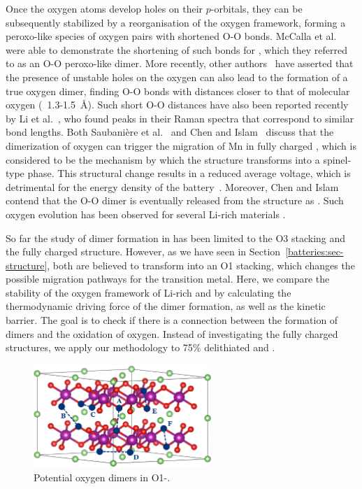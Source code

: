 \begin{refsection}
Once the oxygen atoms develop holes on their $p$-orbitals, they can be 
subsequently stabilized by a reorganisation of the oxygen framework, forming a 
peroxo-like species of oxygen pairs with shortened O-O bonds. McCalla et 
al.~\cite{McCalla2015} were able to demonstrate the shortening of such bonds 
for , which they referred to as an O-O peroxo-like dimer. More 
recently, other authors~\cite{Saubanere2016, Chen2016} have asserted that the 
presence of unstable holes on the oxygen can also lead to the formation of a 
true oxygen dimer, finding O-O bonds with distances closer to that of 
molecular oxygen (~1.3-1.5~\si{\angstrom}). Such short O-O distances have also 
been reported recently by Li et al.~\cite{Li2018}, who found peaks in their 
Raman spectra that correspond to similar bond lengths. Both Saubani\`ere et 
al.~\cite{Saubanere2016} and Chen and Islam~\cite{Chen2016} discuss that the 
dimerization of oxygen can trigger the migration of Mn in fully charged 
, which is considered to be the mechanism by which the structure 
transforms into a spinel-type phase. This structural change results in a 
reduced average voltage, which is detrimental for the energy density of the 
battery~\cite{Rozier2015}. Moreover, Chen and Islam contend that the O-O dimer is eventually 
released from the structure as . Such oxygen evolution has been 
observed for several Li-rich materials \cite{Armstrong2006, Luo2016}.
 
So far the study of dimer formation in  has been limited to the O3 
stacking and the fully charged structure. However, as we have seen in 
Section~\ref{batteries:sec-structure}, both   are 
believed to transform into an O1 stacking, which changes the possible 
migration pathways for the transition metal. Here, we compare the stability of 
the oxygen framework of Li-rich  and  by calculating 
the thermodynamic driving force of the dimer formation, as well as the kinetic 
barrier. The goal is to check if there is a connection between the formation 
of dimers and the oxidation of oxygen. Instead of investigating the fully 
charged structures, we apply our methodology to 75\% delithiated 
 and .  
 
\begin{figure}[ht]
\centering 
\captionsetup{width=0.9\linewidth}
\includegraphics[width=0.6\textwidth]{Figures/batteries/oxygen_dimers.png} 
\caption{Potential oxygen dimers in O1-.} 
\label{batteries:fig-oxygen_dimers}  
\end{figure} 
 

\end{refsection}

